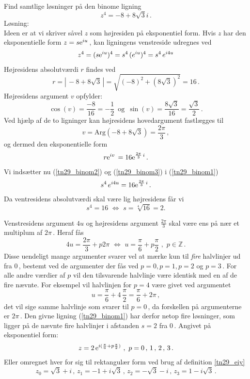 \begin{example}\label{tn29_binom}
Find samtlige løsninger på den binome ligning
\begin{equation}\label{tn29_binom1}
z^4=-8+8\sqrt 3 i\,.
\end{equation}
Løsning:\\
Ideen er at vi skriver såvel $z$ som højresiden på eksponentiel form.\bs 
Hvis $z$ har den eksponentielle form $z=s\mathrm{e}^{iu}\,$, kan ligningens venstreside udregnes ved 
\begin{equation}\label{tn29_binom2}
z^4=(s\mathrm{e}^{iu})^4=s^4\,(e^{iu})^4=s^4\,e^{i4u}
\end{equation}
Højresidens absolutværdi $r$ findes ved
$$r=|\,-8+8\sqrt 3\,|=\sqrt{(-8)^2+(8\sqrt 3)^2}=16\,.$$
Højresidens argument $v$ opfylder:
$$\cos(v)=\frac{-8}{16}=-\frac{1}{2}\,\,\,\mathrm{og}\,\,\,
\sin(v)=\frac{8\sqrt 3} {16}=\frac{\sqrt 3}{2}\,.$$
Ved hjælp af de to ligninger kan højresidens hovedargument fastlægges til 
$$v=\mathrm{Arg}(-8+8\sqrt 3)=\frac {2\pi}3\,,$$
og dermed den eksponentielle form
\begin{equation}\label{tn29_binom3}
r\mathrm{e}^{iv}\,=16\mathrm{e}^{\frac {2\pi}3\,i}\,.
\end{equation}
Vi indsætter nu (\ref{tn29_binom2}) og (\ref{tn29_binom3}) i (\ref{tn29_binom1})
$$
s^4\,e^{i4u}=16\mathrm{e}^{\frac {2\pi}3\,i}\,.
$$
Da ventresidens absolutværdi skal være lig højresidens får vi
$$
s^4=16\,\,\Leftrightarrow\,\, s=\sqrt[4]{16}=2.
$$

Venstresidens argument $4u$ og højresidens argument $\frac {2\pi}3$ skal være ens på nær et multiplum af $2\pi\,$. Heraf fås
$$4u=\frac {2\pi}3+p2\pi\,\,
\Leftrightarrow\,\, u =\frac {\pi}6 +p\frac {\pi}2 \,\,,\,\,p\in \mathbb Z\,.
$$
Disse uendeligt mange argumenter svarer vel at mærke kun til \textit{fire} halvlinjer ud fra $0\,$, bestemt ved de argumenter der fås ved $p=0,p=1,p=2$ og $p=3\,$. For alle andre værdier af $p$ vil den tilsvarende halvlinje være identisk med en af de fire nævnte. For eksempel vil halvlinjen for $p=4$ være givet ved argumentet
$$u=\frac {\pi}6 +4\,\frac{\pi}2=\frac {\pi}6+2\pi\,,$$
det vil sige samme halvlinje som svarer til $p=0\,$, da forskellen på argumenterne er $2\pi\,$.\bs
Den givne ligning (\ref{tn29_binom1}) har derfor netop fire løsninger, som ligger på de nævnte fire halvlinjer i afstanden $s=2$ fra $0\,$. Angivet på  eksponentiel form:
$$z=2\,\mathrm{e}^{i(\frac {\pi}6 +p\frac {\pi}2 )}\,\,,\,\,p=0\,,\,1\,,\,2\,,\,3\,.$$
Eller omregnet hver for sig til rektangulær form ved brug af definition \ref{tn29_eiy}
$$z_0=\sqrt 3+i\,,\,z_1=-1+i\sqrt 3\,,\,z_2=-\sqrt 3-i\,,\,z_3=1-i\sqrt 3\,.$$
\end{example}

